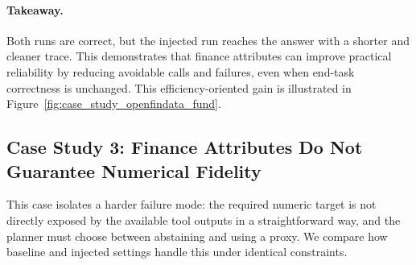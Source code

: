 \paragraph{Takeaway.}
Both runs are correct, but the injected run reaches the answer with a shorter and cleaner trace.
This demonstrates that finance attributes can improve practical reliability by reducing avoidable calls and failures,
even when end-task correctness is unchanged.
This efficiency-oriented gain is illustrated in Figure~\ref{fig:case_study_openfindata_fund}.

\subsection{Case Study 3: Finance Attributes Do Not Guarantee Numerical Fidelity}
\label{sec:case_study_financebench_cogs}

This case isolates a harder failure mode: the required numeric target is not directly exposed by the
available tool outputs in a straightforward way, and the planner must choose between abstaining and
using a proxy. We compare how baseline and injected settings handle this under identical constraints.

